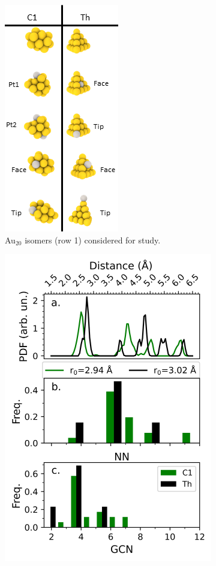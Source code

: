 \begin{figure}
\centering
\begin{subfigure}[b]{0.45\textwidth}
    \centering
    \includegraphics{figures/LM/AuPt_EPJ/Structures.png}
    \caption{Au$_{20}$ isomers (row 1) considered for study.}
    \label{Fig:Sites}
\end{subfigure}
\begin{subfigure}[b]{0.45\textwidth}
    \centering
    \includegraphics{figures/LM/AuPt_EPJ/Th_C1_Comp.jpeg}

\end{subfigure}
\end{figure}

